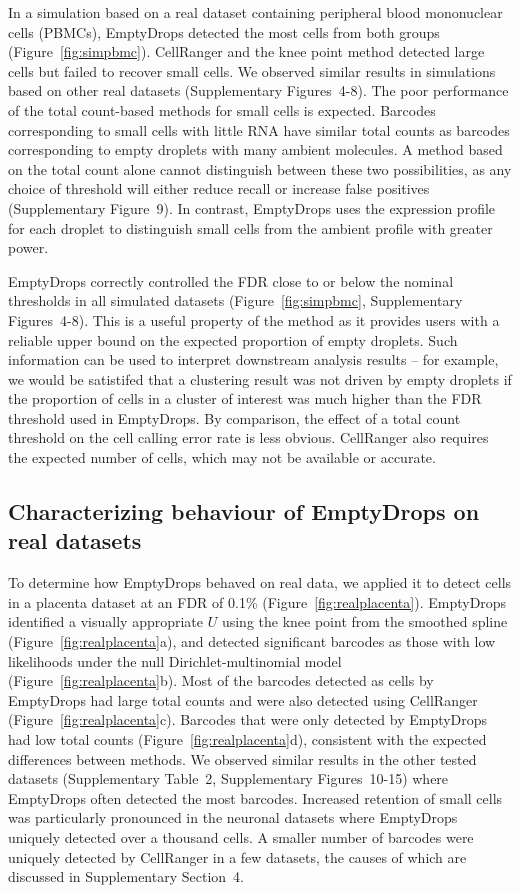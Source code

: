 \documentclass{bmcart}
\newcommand{\supptabdataset}{2}
\newcommand{\suppfigsimresults}{4-8}
\newcommand{\suppfigsimrocs}{9}
\newcommand{\suppfigrealresults}{10-15}
\newcommand{\suppsecpower}{4}
\begin{document}
In a simulation based on a real dataset containing peripheral blood mononuclear cells (PBMCs), EmptyDrops detected the most cells from both groups (Figure~\ref{fig:simpbmc}).
CellRanger and the knee point method detected large cells but failed to recover small cells.
We observed similar results in simulations based on other real datasets (Supplementary Figures~\suppfigsimresults{}).
The poor performance of the total count-based methods for small cells is expected.
Barcodes corresponding to small cells with little RNA have similar total counts as barcodes corresponding to empty droplets with many ambient molecules.
A method based on the total count alone cannot distinguish between these two possibilities, 
as any choice of threshold will either reduce recall or increase false positives (Supplementary Figure~\suppfigsimrocs{}).
In contrast, EmptyDrops uses the expression profile for each droplet to distinguish small cells from the ambient profile with greater power.

EmptyDrops correctly controlled the FDR close to or below the nominal thresholds in all simulated datasets (Figure~\ref{fig:simpbmc}, Supplementary Figures~\suppfigsimresults{}).
This is a useful property of the method as it provides users with a reliable upper bound on the expected proportion of empty droplets.
Such information can be used to interpret downstream analysis results --
for example, we would be satistifed that a clustering result was not driven by empty droplets if the proportion of cells in a cluster of interest was much higher than the FDR threshold used in EmptyDrops.
By comparison, the effect of a total count threshold on the cell calling error rate is less obvious.
CellRanger also requires the expected number of cells, which may not be available or accurate.

\subsection*{Characterizing behaviour of EmptyDrops on real datasets}
To determine how EmptyDrops behaved on real data, we applied it to detect cells in a placenta dataset \cite{vento2018single} at an FDR of 0.1\% (Figure~\ref{fig:realplacenta}).
EmptyDrops identified a visually appropriate $U$ using the knee point from the smoothed spline (Figure~\ref{fig:realplacenta}a),
and detected significant barcodes as those with low likelihoods under the null Dirichlet-multinomial model (Figure~\ref{fig:realplacenta}b).
Most of the barcodes detected as cells by EmptyDrops had large total counts and were also detected using CellRanger (Figure~\ref{fig:realplacenta}c). 
Barcodes that were only detected by EmptyDrops had low total counts (Figure~\ref{fig:realplacenta}d), consistent with the expected differences between methods.
We observed similar results in the other tested datasets (Supplementary Table~\supptabdataset{}, Supplementary Figures~\suppfigrealresults{})
where EmptyDrops often detected the most barcodes.
Increased retention of small cells was particularly pronounced in the neuronal datasets where EmptyDrops uniquely detected over a thousand cells.
A smaller number of barcodes were uniquely detected by CellRanger in a few datasets, the causes of which are discussed in Supplementary Section~\suppsecpower{}.
\end{document}
